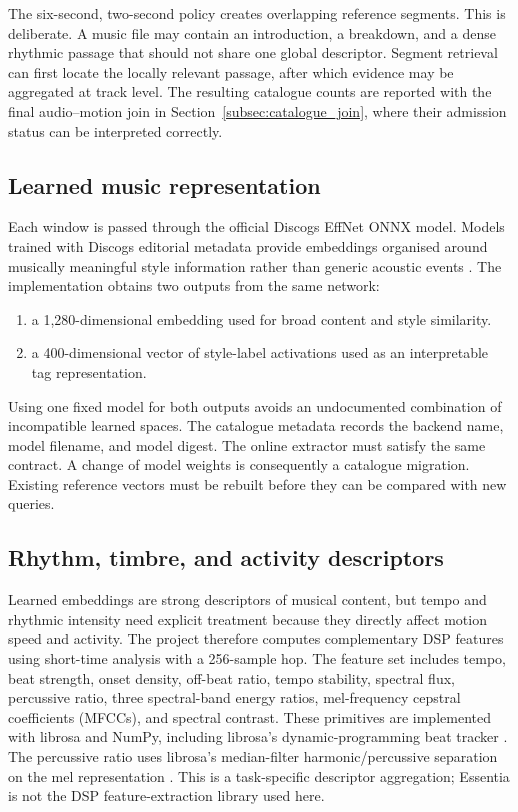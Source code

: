 The six-second, two-second policy creates overlapping reference segments. This
is deliberate. A music file may contain an introduction, a breakdown, and a
dense rhythmic passage that should not share one global descriptor. Segment
retrieval can first locate the locally relevant passage, after which evidence
may be aggregated at track level. The resulting catalogue counts are reported
with the final audio--motion join in Section~\ref{subsec:catalogue_join}, where
their admission status can be interpreted correctly.

\subsection{Learned music representation}
\label{subsec:learned_audio_representation}

Each window is passed through the official Discogs EffNet ONNX model. Models
trained with Discogs editorial metadata provide embeddings organised around
musically meaningful style information rather than generic acoustic events
\cite{alonso2022music}. The implementation obtains two outputs from the same
network:

\begin{enumerate}[label=(\arabic*)]
    \item a 1,280-dimensional embedding used for broad content and style
    similarity.
    \item a 400-dimensional vector of style-label activations used as an
    interpretable tag representation.
\end{enumerate}

Using one fixed model for both outputs avoids an undocumented combination of
incompatible learned spaces. The catalogue metadata records the backend name,
model filename, and model digest. The online extractor must satisfy the same
contract. A change of model weights is consequently a catalogue migration. Existing reference vectors must be
rebuilt before they can be compared with new queries.

\subsection{Rhythm, timbre, and activity descriptors}
\label{subsec:audio_dsp_features}

Learned embeddings are strong descriptors of musical content, but tempo and
rhythmic intensity need explicit treatment because they directly affect motion
speed and activity. The project therefore computes complementary DSP features
using short-time analysis with a 256-sample hop. The feature set includes tempo,
beat strength, onset density, off-beat ratio, tempo stability, spectral flux,
percussive ratio, three spectral-band energy ratios, mel-frequency cepstral
coefficients (MFCCs), and spectral contrast. These primitives are implemented
with librosa and NumPy, including librosa's dynamic-programming beat tracker
\cite{mcfee2015librosa,ellis2007beat}. The percussive ratio uses librosa's
median-filter harmonic/percussive separation on the mel representation
\cite{fitzgerald2010harmonic}. This is a task-specific descriptor aggregation;
Essentia is not the DSP feature-extraction library used here.

